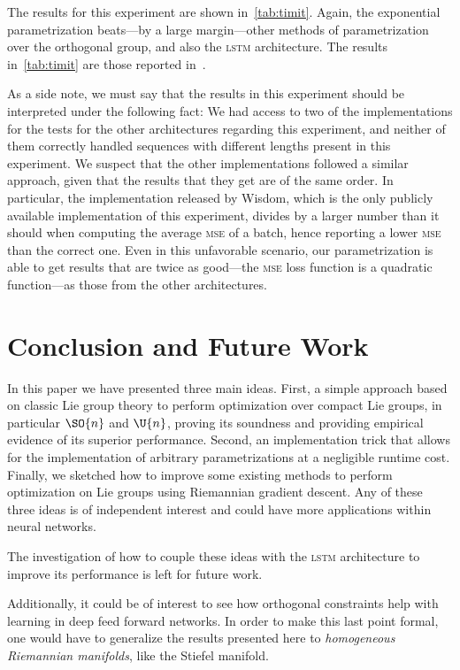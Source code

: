 The results for this experiment are shown in~\ref{tab:timit}. Again, the exponential parametrization beats---by a large margin---other methods of parametrization over the orthogonal group, and also the \textsc{lstm} architecture. The results in~\ref{tab:timit} are those reported in~\cite{helfrich18a}.

As a side note, we must say that the results in this experiment should be interpreted under the following fact: We had access to two of the implementations for the tests for the other architectures regarding this experiment, and neither of them correctly handled sequences with different lengths present in this experiment. We suspect that the other implementations followed a similar approach, given that the results that they get are of the same order. In particular, the implementation released by Wisdom, which is the only publicly available implementation of this experiment, divides by a larger number than it should when computing the average \textsc{mse} of a batch, hence reporting a lower \textsc{mse} than the correct one. Even in this unfavorable scenario, our parametrization is able to get results that are twice as good---the \textsc{mse} loss function is a quadratic function---as those from the other architectures.

\section{Conclusion and Future Work} In this paper we have presented three main ideas. First, a simple approach based on classic Lie group theory to perform optimization over compact Lie groups, in particular $\SO{n}$ and $\U{n}$, proving its soundness and providing empirical evidence of its superior performance. Second, an implementation trick that allows for the implementation of arbitrary parametrizations at a negligible runtime cost. Finally, we sketched how to improve some existing methods to perform optimization on Lie groups using Riemannian gradient descent. Any of these three ideas is of independent interest and could have more applications within neural networks.

The investigation of how to couple these ideas with the \textsc{lstm} architecture to improve its performance is left for future work.

Additionally, it could be of interest to see how orthogonal constraints help with learning in deep feed forward networks. In order to make this last point formal, one would have to generalize the results presented here to \emph{homogeneous Riemannian manifolds}, like the Stiefel manifold.

\ifdefined\isarxiv
\else \fi


